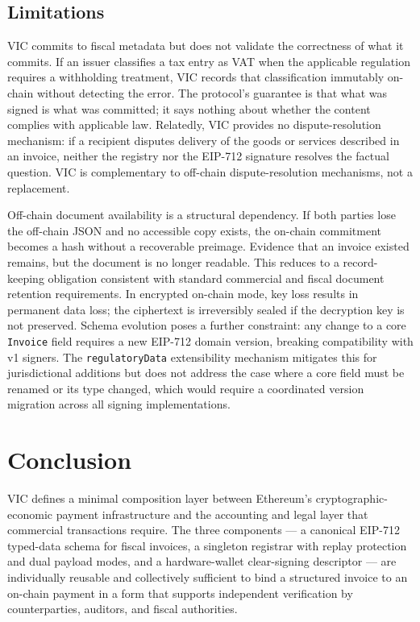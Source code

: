 \documentclass[11pt,a4paper]{article}
\begin{document}
\subsection{Limitations}

VIC commits to fiscal metadata but does not validate the correctness of what it commits. If an issuer classifies a tax entry as VAT when the applicable regulation requires a withholding treatment, VIC records that classification immutably on-chain without detecting the error. The protocol's guarantee is that what was signed is what was committed; it says nothing about whether the content complies with applicable law. Relatedly, VIC provides no dispute-resolution mechanism: if a recipient disputes delivery of the goods or services described in an invoice, neither the registry nor the EIP-712 signature resolves the factual question. VIC is complementary to off-chain dispute-resolution mechanisms, not a replacement.

Off-chain document availability is a structural dependency. If both parties lose the off-chain JSON and no accessible copy exists, the on-chain commitment becomes a hash without a recoverable preimage. Evidence that an invoice existed remains, but the document is no longer readable. This reduces to a record-keeping obligation consistent with standard commercial and fiscal document retention requirements. In encrypted on-chain mode, key loss results in permanent data loss; the ciphertext is irreversibly sealed if the decryption key is not preserved. Schema evolution poses a further constraint: any change to a core \texttt{Invoice} field requires a new EIP-712 domain version, breaking compatibility with v1 signers. The \texttt{regulatoryData} extensibility mechanism mitigates this for jurisdictional additions but does not address the case where a core field must be renamed or its type changed, which would require a coordinated version migration across all signing implementations.

\section{Conclusion}
\label{sec:conclusion}

VIC defines a minimal composition layer between Ethereum's cryptographic-economic payment infrastructure and the accounting and legal layer that commercial transactions require. The three components --- a canonical EIP-712 typed-data schema for fiscal invoices, a singleton registrar with replay protection and dual payload modes, and a hardware-wallet clear-signing descriptor --- are individually reusable and collectively sufficient to bind a structured invoice to an on-chain payment in a form that supports independent verification by counterparties, auditors, and fiscal authorities.
\end{document}
